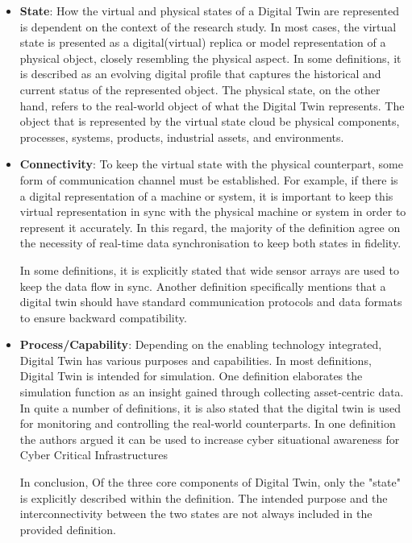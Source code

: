 \begin{itemize}
    \item \textbf{State}: How the virtual and physical states of a Digital Twin are represented is dependent on the context of the research study. In most cases, the virtual state is presented as a digital(virtual) replica or model representation of a physical object, closely resembling the physical aspect. In some definitions, it is described as an evolving digital profile that captures the historical and current status of the represented object. The physical state, on the other hand, refers to the real-world object of what the Digital Twin represents. The object that is represented by the virtual state cloud be physical components, processes, systems, products, industrial assets, and environments.

    \item \textbf{Connectivity}: To keep the virtual state with the physical counterpart, some form of communication channel must be established. For example, if there is a digital representation of a machine or system, it is important to keep this virtual representation in sync with the physical machine or system in order to represent it accurately. In this regard, the majority of the definition agree on the necessity of real-time data synchronisation to keep both states in fidelity.
    
    In some definitions, it is explicitly stated that wide sensor arrays are used to keep the data flow in sync. Another definition specifically mentions that a digital twin should have standard communication protocols and data formats to ensure backward compatibility.   

 
    \item \textbf{Process/Capability}: Depending on the enabling technology integrated, Digital Twin has various purposes and capabilities.  In most definitions, Digital Twin is intended for simulation. One definition elaborates the simulation function as an insight gained through collecting asset-centric data. In quite a number of definitions, it is also stated that the digital twin is used for monitoring and controlling the real-world counterparts. In one definition the authors argued it can be used to increase cyber situational awareness for Cyber Critical Infrastructures


    In conclusion, Of the three core components of Digital Twin, only the "state" is explicitly described within the definition. The intended purpose and the interconnectivity between the two states are not always included in the provided definition.



    
\end{itemize}

